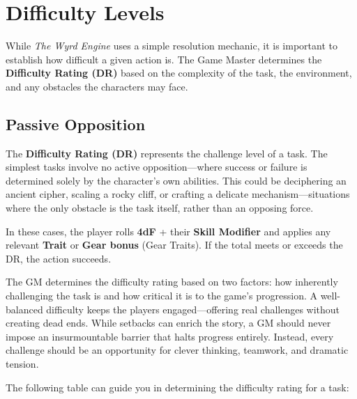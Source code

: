 \section{Difficulty Levels}
\label{core:difficulty-rating}

While \emph{The Wyrd Engine} uses a simple resolution mechanic, it is important to establish how difficult a given action is. The Game Master determines the \textbf{Difficulty Rating (DR)} based on the complexity of the task, the environment, and any obstacles the characters may face.

\subsection{Passive Opposition}
The \textbf{Difficulty Rating (DR)} represents the challenge level of a task. The simplest tasks involve no active opposition—where success or failure is determined solely by the character’s own abilities. This could be deciphering an ancient cipher, scaling a rocky cliff, or crafting a delicate mechanism—situations where the only obstacle is the task itself, rather than an opposing force.

In these cases, the player rolls \textbf{4dF} + their \textbf{Skill Modifier} and applies any relevant \textbf{Trait} or \textbf{Gear bonus} (Gear Traits). If the total meets or exceeds the DR, the action succeeds.

The GM determines the difficulty rating based on two factors: how inherently challenging the task is and how critical it is to the game’s progression. A well-balanced difficulty keeps the players engaged—offering real challenges without creating dead ends. While setbacks can enrich the story, a GM should never impose an insurmountable barrier that halts progress entirely. Instead, every challenge should be an opportunity for clever thinking, teamwork, and dramatic tension.

The following table can guide you in determining the difficulty rating for a task:

